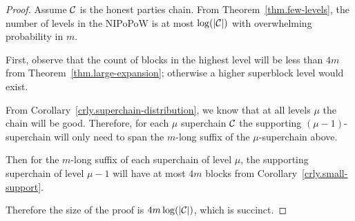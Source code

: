 \begin{proof}
    Assume $\mathcal{C}$ is the honest parties chain. From
    Theorem~\ref{thm.few-levels}, the number of levels in the NIPoPoW is at most
    $\log(|\mathcal{C}|)$ with overwhelming probability in $m$.

    First, observe that the count of blocks in the highest level will be less
    than $4m$ from Theorem~\ref{thm.large-expansion}; otherwise a higher
    superblock level would exist.

    From Corollary~\ref{crly.superchain-distribution}, we know that at all
    levels $\mu$ the chain will be good. Therefore, for each $\mu$ superchain
    $\mathcal{C}$ the supporting $(\mu - 1)$-superchain will only need to span the
    $m$-long suffix of the $\mu$-superchain above.

    Then for the $m$-long suffix of each superchain of level $\mu$, the
    supporting superchain of level $\mu - 1$ will have at most $4m$ blocks from
    Corollary~\ref{crly.small-support}.

    Therefore the size of the proof is $4m \log(|\mathcal{C}|)$, which is succinct.
    \Qed
\end{proof}
